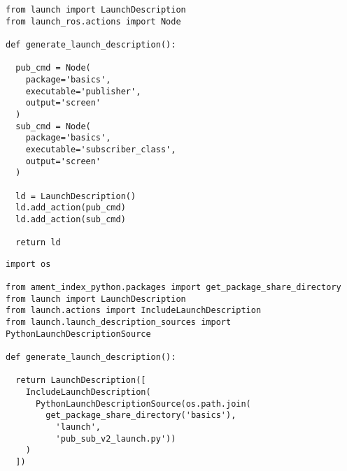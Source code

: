  \footnotesize
\begin{tcolorbox}[sharp corners, colframe=gray!80, colback=LightGray, left=0pt, top=0pt, bottom=0pt, title=\texttt{br2\_basics/launch/pub\_sub\_v1\_launch.py}]
  \begin{verbatim}
from launch import LaunchDescription
from launch_ros.actions import Node

def generate_launch_description():

  pub_cmd = Node(
    package='basics',
    executable='publisher',
    output='screen'
  )
  sub_cmd = Node(
    package='basics',
    executable='subscriber_class',
    output='screen'
  )

  ld = LaunchDescription()
  ld.add_action(pub_cmd)
  ld.add_action(sub_cmd)

  return ld
    \end{verbatim}
    \end{tcolorbox}
  \normalsize

 \footnotesize
\begin{tcolorbox}[sharp corners, colframe=gray!80, colback=LightGray, left=0pt, top=0pt, bottom=0pt, title=\texttt{br2\_basics/launch/includer\_launch.py}]
  \begin{verbatim}
import os

from ament_index_python.packages import get_package_share_directory
from launch import LaunchDescription
from launch.actions import IncludeLaunchDescription
from launch.launch_description_sources import PythonLaunchDescriptionSource

def generate_launch_description():

  return LaunchDescription([
    IncludeLaunchDescription(
      PythonLaunchDescriptionSource(os.path.join(
        get_package_share_directory('basics'),
          'launch',
          'pub_sub_v2_launch.py'))
    )
  ])
    \end{verbatim}
    \end{tcolorbox}
  \normalsize

